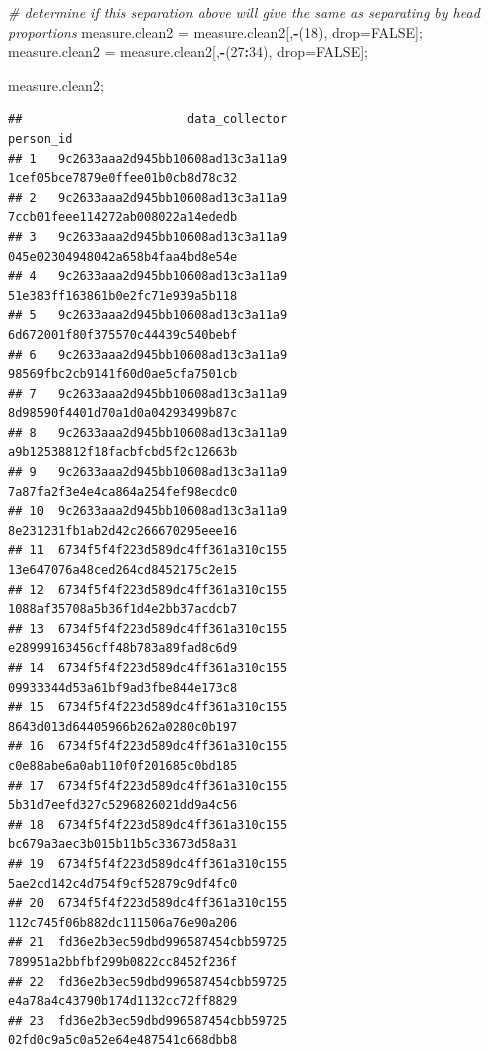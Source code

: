 \documentclass[]{article}
\newenvironment{Shaded}{\begin{snugshade}}{\end{snugshade}}
\newcommand{\CommentTok}[1]{\textcolor[rgb]{0.56,0.35,0.01}{\textit{#1}}}
\newcommand{\DecValTok}[1]{\textcolor[rgb]{0.00,0.00,0.81}{#1}}
\newcommand{\NormalTok}[1]{#1}
\newcommand{\OperatorTok}[1]{\textcolor[rgb]{0.81,0.36,0.00}{\textbf{#1}}}
\newcommand{\OtherTok}[1]{\textcolor[rgb]{0.56,0.35,0.01}{#1}}
\newcommand{\StringTok}[1]{\textcolor[rgb]{0.31,0.60,0.02}{#1}}
\begin{document}
\begin{Shaded}
\begin{Highlighting}[]
\CommentTok{\# determine if this separation above will give the same as separating by head proportions}
\NormalTok{measure.clean2 =}\StringTok{ }\NormalTok{measure.clean2[,}\OperatorTok{{-}}\NormalTok{(}\DecValTok{18}\NormalTok{), drop=}\OtherTok{FALSE}\NormalTok{];}
\NormalTok{measure.clean2 =}\StringTok{ }\NormalTok{measure.clean2[,}\OperatorTok{{-}}\NormalTok{(}\DecValTok{27}\OperatorTok{:}\DecValTok{34}\NormalTok{), drop=}\OtherTok{FALSE}\NormalTok{];}

\NormalTok{measure.clean2;}
\end{Highlighting}
\end{Shaded}

\begin{verbatim}
##                       data_collector                          person_id
## 1   9c2633aaa2d945bb10608ad13c3a11a9   1cef05bce7879e0ffee01b0cb8d78c32
## 2   9c2633aaa2d945bb10608ad13c3a11a9   7ccb01feee114272ab008022a14ededb
## 3   9c2633aaa2d945bb10608ad13c3a11a9   045e02304948042a658b4faa4bd8e54e
## 4   9c2633aaa2d945bb10608ad13c3a11a9   51e383ff163861b0e2fc71e939a5b118
## 5   9c2633aaa2d945bb10608ad13c3a11a9   6d672001f80f375570c44439c540bebf
## 6   9c2633aaa2d945bb10608ad13c3a11a9   98569fbc2cb9141f60d0ae5cfa7501cb
## 7   9c2633aaa2d945bb10608ad13c3a11a9   8d98590f4401d70a1d0a04293499b87c
## 8   9c2633aaa2d945bb10608ad13c3a11a9   a9b12538812f18facbfcbd5f2c12663b
## 9   9c2633aaa2d945bb10608ad13c3a11a9   7a87fa2f3e4e4ca864a254fef98ecdc0
## 10  9c2633aaa2d945bb10608ad13c3a11a9   8e231231fb1ab2d42c266670295eee16
## 11  6734f5f4f223d589dc4ff361a310c155   13e647076a48ced264cd8452175c2e15
## 12  6734f5f4f223d589dc4ff361a310c155   1088af35708a5b36f1d4e2bb37acdcb7
## 13  6734f5f4f223d589dc4ff361a310c155   e28999163456cff48b783a89fad8c6d9
## 14  6734f5f4f223d589dc4ff361a310c155   09933344d53a61bf9ad3fbe844e173c8
## 15  6734f5f4f223d589dc4ff361a310c155   8643d013d64405966b262a0280c0b197
## 16  6734f5f4f223d589dc4ff361a310c155   c0e88abe6a0ab110f0f201685c0bd185
## 17  6734f5f4f223d589dc4ff361a310c155   5b31d7eefd327c5296826021dd9a4c56
## 18  6734f5f4f223d589dc4ff361a310c155   bc679a3aec3b015b11b5c33673d58a31
## 19  6734f5f4f223d589dc4ff361a310c155   5ae2cd142c4d754f9cf52879c9df4fc0
## 20  6734f5f4f223d589dc4ff361a310c155   112c745f06b882dc111506a76e90a206
## 21  fd36e2b3ec59dbd996587454cbb59725   789951a2bbfbf299b0822cc8452f236f
## 22  fd36e2b3ec59dbd996587454cbb59725   e4a78a4c43790b174d1132cc72ff8829
## 23  fd36e2b3ec59dbd996587454cbb59725   02fd0c9a5c0a52e64e487541c668dbb8

\end{verbatim}
\end{document}

